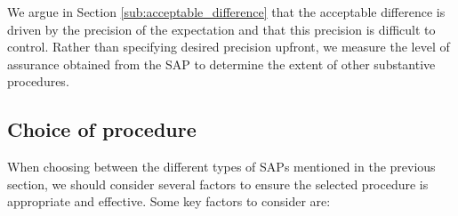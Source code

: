 \bigskip
We argue in Section \ref{sub:acceptable_difference} that the acceptable difference is driven by the precision of the expectation and that this precision is difficult to control. Rather than specifying desired precision upfront, we measure the level of assurance obtained from the SAP to determine the extent of other substantive procedures.


\subsection{Choice of procedure} %
\label{sub:choice_of_procedure}

When choosing between the different types of SAPs mentioned in the previous section, we should consider several factors to ensure the selected procedure is appropriate and effective. Some key factors to consider are:

